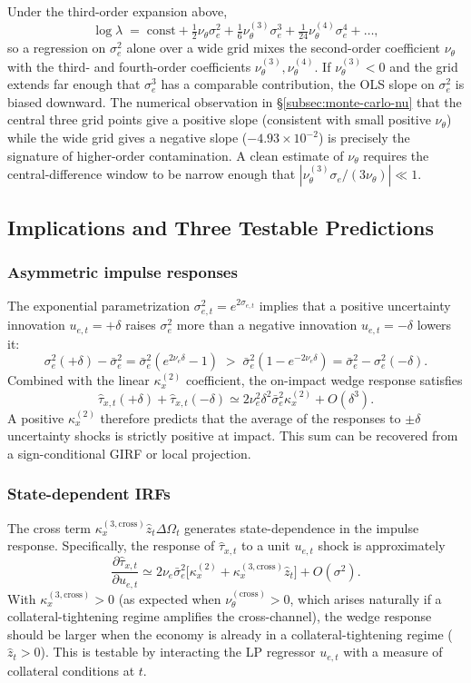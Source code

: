 \documentclass[11pt]{article}
\newcommand{\kxtwo}{\kappa_x^{(2)}}
\newcommand{\kxcross}{\kappa_x^{(3,\mathrm{cross})}}
\newcommand{\nuth}{\nu_\theta}
\newcommand{\nuthIII}{\nu_\theta^{(3)}}
\newcommand{\nuthx}{\nu_\theta^{(\mathrm{cross})}}
\theoremstyle{plain}
\theoremstyle{definition}
\begin{document}
Under the third-order expansion above,
\[
\log\lambda \;=\; \mathrm{const} + \tfrac{1}{2}\nuth\sigma_e^2 +
\tfrac{1}{6}\nuthIII\sigma_e^3 + \tfrac{1}{24}\nu_\theta^{(4)}\sigma_e^4 + \dots,
\]
so a regression on $\sigma_e^2$ alone over a wide grid mixes the second-order
coefficient $\nuth$ with the third- and fourth-order coefficients
$\nuthIII,\nu_\theta^{(4)}$. If $\nuthIII<0$ and the grid extends far enough
that $\sigma_e^3$ has a comparable contribution, the OLS slope on $\sigma_e^2$
is biased downward. The numerical observation in §\ref{subsec:monte-carlo-nu}
that the central three grid points give a positive slope (consistent with
small positive $\nuth$) while the wide grid gives a negative slope
($-4.93\times 10^{-2}$) is precisely the signature of higher-order contamination.
A clean estimate of $\nuth$ requires the central-difference window to be
narrow enough that $|\nuthIII\sigma_e/(3\nuth)|\ll 1$.

\subsection{Implications and Three Testable Predictions}

\subsubsection*{Asymmetric impulse responses}

The exponential parametrization $\sigma^2_{e,t}=e^{2\sigma_{e,t}}$ implies
that a positive uncertainty innovation $u_{e,t}=+\delta$ raises $\sigma_e^2$
more than a negative innovation $u_{e,t}=-\delta$ lowers it:
\[
\sigma_e^2(+\delta)-\bar\sigma_e^2 = \bar\sigma_e^2(e^{2\nu_e\delta}-1)
\;>\;
\bar\sigma_e^2(1-e^{-2\nu_e\delta}) = \bar\sigma_e^2-\sigma_e^2(-\delta).
\]
Combined with the linear $\kxtwo$ coefficient, the on-impact wedge response
satisfies
\[
\hat\tau_{x,t}(+\delta)+\hat\tau_{x,t}(-\delta)
\simeq 2\nu_e^2\delta^2\bar\sigma_e^2\kxtwo + O(\delta^3).
\]
A positive $\kxtwo$ therefore predicts that the average of the responses to
$\pm\delta$ uncertainty shocks is strictly positive at impact. This sum can be
recovered from a sign-conditional GIRF or local projection.

\subsubsection*{State-dependent IRFs}

The cross term $\kxcross\hat z_t\Delta\Omega_t$ generates state-dependence in
the impulse response. Specifically, the response of $\hat\tau_{x,t}$ to a unit
$u_{e,t}$ shock is approximately
\[
\frac{\partial\hat\tau_{x,t}}{\partial u_{e,t}}
\simeq 2\nu_e\bar\sigma_e^2\big[\kxtwo+\kxcross\hat z_t\big]
+ O(\sigma^2).
\]
With $\kxcross>0$ (as expected when $\nuthx>0$, which arises naturally if a
collateral-tightening regime amplifies the cross-channel), the wedge response
should be larger when the economy is already in a collateral-tightening
regime ($\hat z_t>0$). This is testable by interacting the LP regressor
$u_{e,t}$ with a measure of collateral conditions at $t$.
\end{document}
